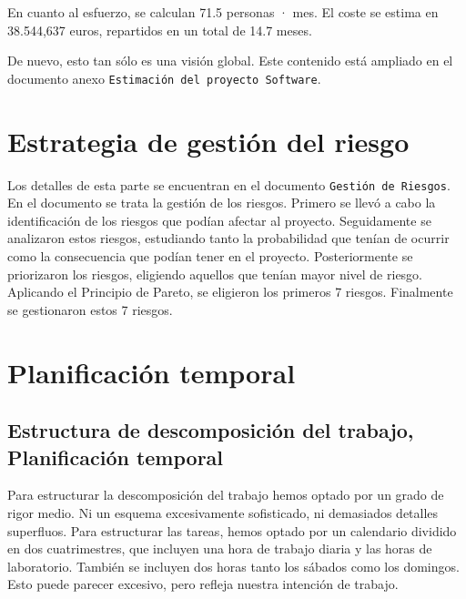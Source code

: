 \documentclass[spanish,a4paper,11pt, twoside]{report}	%
\begin{document}
		En cuanto al esfuerzo, se calculan 71.5 personas · mes. El coste se estima en 38.544,637 euros, repartidos en un total de 14.7 meses.

		De nuevo, esto tan sólo es una visión global. Este contenido está ampliado en el
		documento anexo \texttt{Estimación del proyecto Software}.


\setcounter{section}{0}
\chapter{Estrategia de gestión del riesgo}

	Los detalles de esta parte se encuentran en el documento \texttt{Gestión de Riesgos}.\\
	En el documento se trata la gestión de los riesgos. Primero se llevó a cabo la identificación de los riesgos que podían afectar al proyecto.
	Seguidamente se analizaron estos riesgos, estudiando tanto la probabilidad que tenían de ocurrir como la consecuencia que podían 
	tener en el proyecto. Posteriormente se priorizaron los riesgos, eligiendo aquellos que tenían mayor nivel de riesgo. Aplicando el Principio de Pareto, 
	se eligieron los primeros 7 riesgos.
	Finalmente se gestionaron estos 7 riesgos.

\newpage
\mbox{}
\thispagestyle{empty}						%
\newpage
\setcounter{section}{0}

\chapter{Planificación temporal}

	\section{Estructura de descomposición del trabajo, Planificación temporal}
	Para estructurar la descomposición del trabajo hemos optado por un grado de rigor medio. Ni un esquema excesivamente sofisticado, ni demasiados detalles superfluos. 
	Para estructurar las tareas, hemos optado por un calendario dividido en dos cuatrimestres, que incluyen una hora de trabajo diaria y las horas de laboratorio. También se incluyen dos 
	horas tanto los sábados como los domingos. Esto puede parecer excesivo, pero refleja nuestra intención de trabajo.
\end{document}
